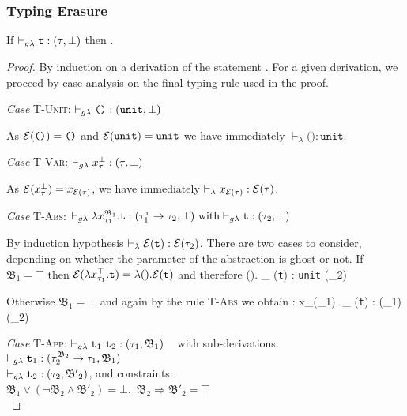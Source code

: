     


\subsubsection{Typing Erasure}
\begin{lemma}
	If  $\vdash_{g\lambda} \texttt{t} : (\tau, \bot)$  
	then .
\end{lemma}
\begin{proof}
By induction on a derivation of the statement 
. 
For a given derivation, we proceed by case analysis on the final typing rule
 used in the proof. 
 
 	\noindent\textit{Case} \textsc{T-Unit}:\quad 
 	$\vdash_{g\lambda} \texttt{()} : (\texttt{unit}, \bot)$ 
 	
 		As  $\mathcal{E}(\texttt{()}) = \texttt{()}$ and $ \mathcal{E}(\texttt{unit}) = \texttt{unit}$
 		 we have immediately $\vdash_{\lambda} \texttt{()} : \texttt{unit}$.
 	
 	\noindent\textit{Case} \textsc{T-Var}:\quad 
 	$\vdash_{g\lambda} x_{\tau}^{\bot} : (\tau, \bot)$
 	 
 	 As  $\mathcal{E}(x_{\tau}^{\bot}) = x_{\mathcal{E}(\tau)}$, we have immediately 
 	 $\vdash_{\lambda} x_{\mathcal{E}(\tau)} : \mathcal{E}(\tau)$.
 	 

 	\noindent\textit{Case} \textsc{T-Abs}:\quad
 		$\vdash_{g\lambda} \lambda x_{\tau_{1}}^{\mathfrak{B}_{1}}.\texttt{t} : (\tau_{1}^{_{1}} \rightarrow 
 		\tau_{2}, \bot)~ \text{with} \vdash_{g\lambda} \texttt{t} : (\tau_{2}, \bot)	$
 		
 		By induction hypothesis $\vdash_{\lambda} \mathcal{E}(\texttt{t}) : \mathcal{E}(\tau_{2}) $.
 		There are two cases to consider, depending on whether the parameter 
 		of the abstraction is ghost or not. If $\mathfrak{B_{1} = \top}$ then 
 		$\mathcal{E}(\lambda x_{\tau_{1}}^{\top}. \texttt{t}) = \lambda (). \mathcal{E}(\texttt{t})$
 		and therefore
 		{\lambda (). \vdash_{\lambda} \e(\texttt{t}) : 
 		\texttt{unit} \rightarrow 	\e(\tau_{2})} 
 	
 		Otherwise $\mathfrak{B_{1} = \bot}$ and again by the rule \textsc{T-Abs} 
 		we obtain :
 		{\lambda x_{\e(\tau_{1})}. \vdash_{\lambda} \e(\texttt{t}) : 
 		\e(\tau_{1}) \rightarrow 	\e(\tau_{2})}
 		
 		 	
 	\noindent\textit{Case} \textsc{T-App}:\quad
 	$\vdash_{g\lambda} \texttt{t}_{1}~\texttt{t}_{2} : (\tau_{1}, \mathfrak{B}_{1}) $ ~
 	with sub-derivations: \\
	$\vdash_{g\lambda} \texttt{t}_{1} : (\tau_{2}^{\mathfrak{B}_{2}} \rightarrow \tau_{1}, \mathfrak{B}_{1})$ \\
	$ \vdash_{g\lambda} \texttt{t}_{2} : (\tau_{2}, \mathfrak{B'}_{2}) $, \quad 
	and constraints: \\ 
	$ \mathfrak{B}_{1}\vee (\neg \mathfrak{B}_{2} \wedge \mathfrak{B'}_{2})=\bot,$
	$ \mathfrak{B}_{2} \Rightarrow \mathfrak{B'}_{2} = \top $ \\
	

\end{proof}
